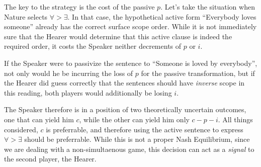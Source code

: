 \documentclass{article}
\begin{document}
%
%
%
%

The key to the strategy is the cost of the passive $p$.
Let's take the situation when Nature selects ${\forall}>{\exists}$.
In that case, the hypothetical active form ``Everybody loves someone'' already has the correct surface scope order.
While it is not immediately sure that the Hearer would determine that this active clause is indeed the required order, it costs the Speaker neither decrements of $p$ or $i$.

If the Speaker were to passivize the sentence to ``Someone is loved by everybody'', not only would he be incurring the loss of $p$ for the passive transformation, but if the Hearer did guess correctly that the sentences should have \emph{inverse} scope in this reading, both players would additionally be losing $i$.

The Speaker therefore is in a position of two theoretically uncertain outcomes, one that can yield him $c$, while the other can yield him only $c-p-i$.
All things considered, $c$ is preferrable, and therefore using the active sentence to express ${\forall}>{\exists}$ should be preferrable.
While this is not a proper Nash Equilibrium, since we are dealing with a non-simultaenous game, this decision can act as a \emph{signal} to the second player, the Hearer.
\end{document}
